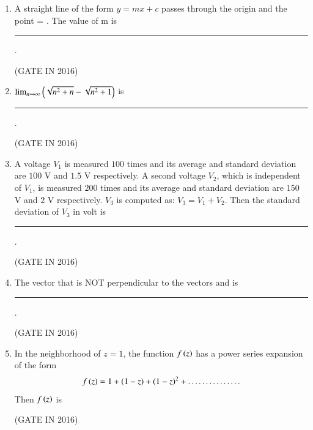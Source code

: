 \documentclass[journal,12pt,onecolumn]{IEEEtran}
\theoremstyle{remark}
\begin{document}
\begin{enumerate}
\item A straight line of the form $y = mx + c$ passes through the origin and the point  = . The value of m is \rule{2cm}{0.4pt}.

\hfill{(GATE IN 2016)}

\item $\lim_{n \to \infty} \left(\sqrt{n^2+n} - \sqrt{n^2+1}\right)$ is \rule{2cm}{0.4pt}.

\hfill{(GATE IN 2016)}

\item A voltage $V_1$ is measured $100$ times and its average and standard deviation are $100$ V and $1.5$ V respectively. A second voltage $V_2$, which is independent of $V_1$, is measured $200$ times and its average and standard deviation are $150$ V and $2$ V respectively. $V_3$ is computed as: $V_3 = V_1 + V_2$. Then the standard deviation of $V_3$ in volt is \rule{2cm}{0.4pt}.

\hfill{(GATE IN 2016)}

\item The vector that is NOT perpendicular to the vectors  and  is \rule{2cm}{0.4pt}.

\hfill{(GATE IN 2016)}
\begin{enumerate}
\end{enumerate}

\item In the neighborhood of $z = 1$, the function $f\left(z\right)$ has a power series expansion of the form 
\begin{align*}
f\left(z\right) = 1 + \left(1 - z\right) + \left(1 - z\right)^2 + \dots\dots\dots\dots\dots
\end{align*}
Then $f\left(z\right)$ is

\hfill{(GATE IN 2016)}
\begin{enumerate}
\end{enumerate}


\end{enumerate}
\end{document}
